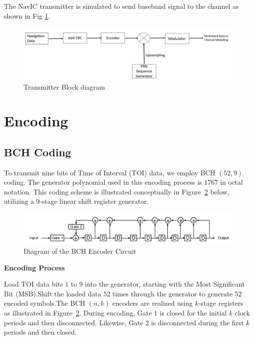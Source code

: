 The NavIC transmitter is simulated to send baseband signal to the channel as shown in Fig \ref{fig:trans_flow}. 

\begin{figure}[ht]
\centering
\includegraphics[width=1\columnwidth]{figs/trans_flow.jpg}
\centering
\captionsetup{justification=centering}
\caption{Transmitter Block diagram}
\label{fig:trans_flow}
\end{figure}

\section{Encoding}

\subsection{BCH Coding}

To transmit nine bits of Time of Interval (TOI) data, we employ BCH $(52, 9)$ coding. The generator polynomial used in this encoding process is $1767$ in octal notation. This coding scheme is illustrated conceptually in Figure~\ref{fig:generator} below, utilizing a 9-stage linear shift register generator.

\begin{figure}[ht]
    \centering
    \includegraphics[width=1.05\columnwidth]{figs/bch.png}
    \caption{Diagram of the BCH Encoder Circuit}
    \label{fig:generator}
\end{figure}

\noindent\textbf{Encoding Process}

\noindent Load TOI data bits $1$ to $9$ into the generator, starting with the Most Significant Bit (MSB).Shift the loaded data $52$ times through the generator to generate $52$ encoded symbols.The BCH $(n, k)$ encoders are realized using $k$-stage registers as illustrated in Figure~\ref{fig:generator}. During encoding, Gate $1$ is closed for the initial $k$ clock periods and then disconnected. Likewise, Gate $2$ is disconnected during the first $k$ periods and then closed.



